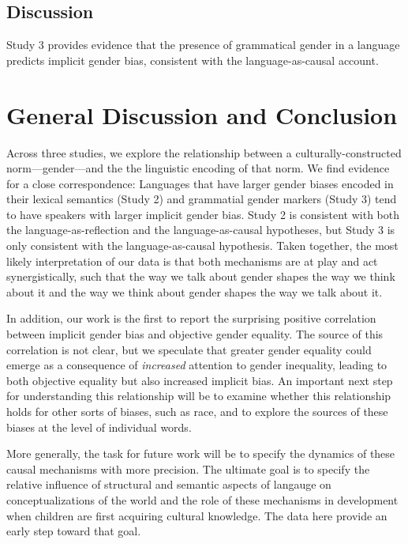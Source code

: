 \documentclass[10pt, letterpaper]{article}
\begin{document}
\subsection{Discussion}\label{discussion-2}

Study 3 provides evidence that the presence of grammatical gender in a
language predicts implicit gender bias, consistent with the
language-as-causal account.

\section{General Discussion and
Conclusion}\label{general-discussion-and-conclusion}

Across three studies, we explore the relationship between a
culturally-constructed norm---gender---and the the linguistic encoding
of that norm. We find evidence for a close correspondence: Languages
that have larger gender biases encoded in their lexical semantics (Study
2) and grammatial gender markers (Study 3) tend to have speakers with
larger implicit gender bias. Study 2 is consistent with both the
language-as-reflection and the language-as-causal hypotheses, but Study
3 is only consistent with the language-as-causal hypothesis. Taken
together, the most likely interpretation of our data is that both
mechanisms are at play and act synergistically, such that the way we
talk about gender shapes the way we think about it and the way we think
about gender shapes the way we talk about it.

In addition, our work is the first to report the surprising positive
correlation between implicit gender bias and objective gender equality.
The source of this correlation is not clear, but we speculate that
greater gender equality could emerge as a consequence of
\emph{increased} attention to gender inequality, leading to both
objective equality but also increased implicit bias. An important next
step for understanding this relationship will be to examine whether this
relationship holds for other sorts of biases, such as race, and to
explore the sources of these biases at the level of individual words.

More generally, the task for future work will be to specify the dynamics
of these causal mechanisms with more precision. The ultimate goal is to
specify the relative influence of structural and semantic aspects of
langauge on conceptualizations of the world and the role of these
mechanisms in development when children are first acquiring cultural
knowledge. The data here provide an early step toward that goal.
\end{document}
